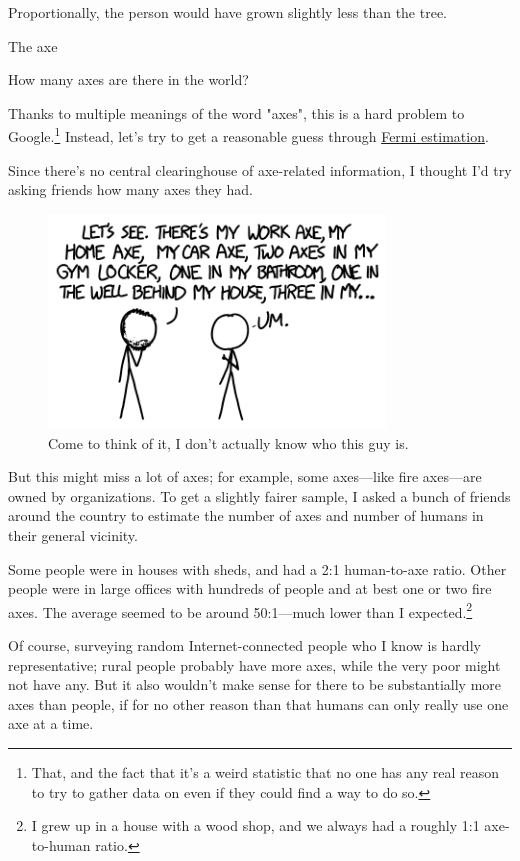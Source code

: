 {{Proportionally, the person would have grown slightly less than the tree.}

{The axe}

{How many axes are there in the world?}

{Thanks to multiple meanings of the word "axes", this is a hard problem to Google.{\footnote{That, and the fact that it's a weird statistic that no one has any real reason to try to gather data on even if they could find a way to do so.} } Instead, let's try to get a reasonable guess through \href{http://what-if.xkcd.com/84/}{Fermi estimation}.}

{Since there's no central clearinghouse of axe-related information, I thought I'd try asking friends how many axes they had.}

\begin{figure}[!htbp]
\centering
\includegraphics[scale=0.5, max width=0.8\textwidth]{imgs/a/90/ygg_ask.png}
\caption{Come to think of it, I don't actually know who this guy is.}
\end{figure}

{But this might miss a lot of axes; for example, some axes—like fire axes—are owned by organizations. To get a slightly fairer sample, I asked a bunch of friends around the country to estimate the number of axes and number of humans in their general vicinity.}

{Some people were in houses with sheds, and had a 2:1 human-to-axe ratio. Other people were in large offices with hundreds of people and at best one or two fire axes. The average seemed to be around 50:1—much lower than I expected.{\footnote{I grew up in a house with a wood shop, and we always had a roughly 1:1 axe-to-human ratio.} } }

{Of course, surveying random Internet-connected people who I know is hardly representative; rural people probably have more axes, while the very poor might not have any. But it also wouldn't make sense for there to be substantially more axes than people, if for no other reason than that humans can only really use one axe at a time.}

}
